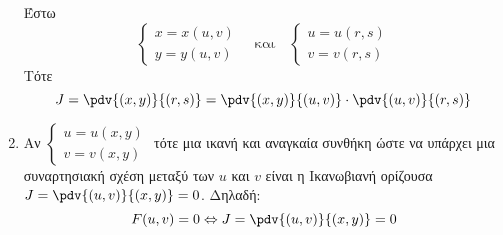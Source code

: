 \begin{example}
\begin{enumerate}
      Έστω 
      \[
        \begin{cases} x=x(u,v) \\
        y=y(u,v)\end{cases} \quad \text{και} \quad 
        \begin{cases} 
          u = u(r,s) \\
          v=v(r,s) 
        \end{cases} 
      \] 
      Τότε
      \[
        J = \pdv{(x,y)}{(r,s)} = \pdv{(x,y)}{(u,v)} \cdot \pdv{(u,v)}{(r,s)}  
      \] 
    \item Αν $ \begin{cases} u=u(x,y) \\ v=v(x,y) \end{cases} $ τότε μια ικανή 
      και αναγκαία συνθήκη ώστε να υπάρχει μια συναρτησιακή σχέση μεταξύ των 
      $ u $ και $v $ είναι η Ικανωβιανή ορίζουσα $ J = \pdv{(u,v)}{(x,y)} = 0 $.
      Δηλαδή:
      \[
        F(u,v)=0 \Leftrightarrow J = \pdv{(u,v)}{(x,y)} = 0 
      \] 
  \end{enumerate}
\end{example}



